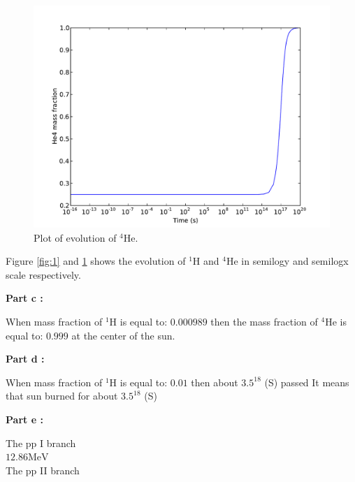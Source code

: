 \documentclass[10pt]{article}
\begin{document}
\begin{figure}[hbt]
 \centering
 \label{fig:2} \includegraphics[scale=0.3]{Plots/plot2.pdf}
 \caption{ Plot of evolution of $^{4}\mathrm{He}$.}
\end{figure}

Figure \ref{fig:1} and \ref{fig:2} shows the evolution of $^{1}\mathrm{H}$ and $^{4}\mathrm{He}$ in semilogy and semilogx scale respectively.

\bfseries{Part c : } \\ \mdseries

When mass fraction of $^{1}\mathrm{H}$ is equal to: $0.000989$ then the mass fraction of $^{4}\mathrm{He}$ is equal to: $0.999$ at the center of the sun.


\bfseries{Part d : } \\ \mdseries

When mass fraction of $^{1}\mathrm{H}$ is equal to: $0.01$ then about $3.5^{18}$ (S) passed It means that sun burned for about $3.5^{18}$ (S)


\bfseries{Part e : } \\ \mdseries

The pp I branch \\

 $12.86 \mathrm{MeV}$ \\

The pp II branch \\

 \\
\end{document}
